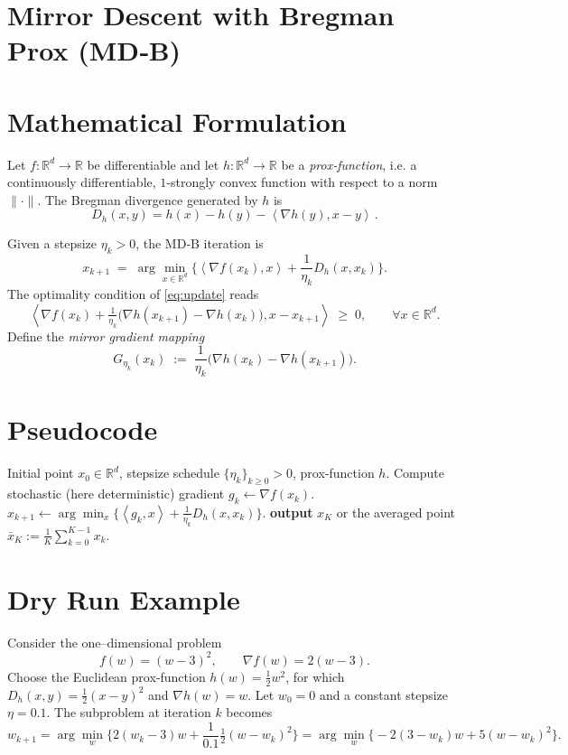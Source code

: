 \documentclass{article}
\newcommand{\inner}[2]{\left\langle #1,#2\right\rangle}
\newcommand{\Breg}[2]{D_{h}(#1,#2)}
\begin{document}
\section*{Mirror Descent with Bregman Prox (MD‑B)}

\section*{Mathematical Formulation}
Let $f:\mathbb{R}^{d}\rightarrow\mathbb{R}$ be differentiable and let $h:\mathbb{R}^{d}\rightarrow\mathbb{R}$ be a \emph{prox‑function}, i.e. a continuously differentiable, $1$‑strongly convex function with respect to a norm $\|\cdot\|$.
The Bregman divergence generated by $h$ is
\[
\Breg{x}{y}=h(x)-h(y)-\inner{\nabla h(y)}{x-y}\, .
\]

Given a stepsize $\eta_{k}>0$, the MD‑B iteration is
\begin{equation}\label{eq:update}
x_{k+1}
\;=\;
\arg\min_{x\in\mathbb{R}^{d}}
\Big\{ \inner{\nabla f(x_{k})}{x}
      +\frac{1}{\eta_{k}}\Breg{x}{x_{k}}\Big\}.
\end{equation}
The optimality condition of \eqref{eq:update} reads
\begin{equation}\label{eq:optcond}
\inner{\nabla f(x_{k})+\tfrac{1}{\eta_{k}}\bigl(\nabla h(x_{k+1})-\nabla h(x_{k})\bigr)}{x-x_{k+1}}\;\ge\;0,
\qquad\forall x\in\mathbb{R}^{d}.
\end{equation}
Define the \emph{mirror gradient mapping}
\[
G_{\eta_{k}}(x_{k}) \;:=\; \frac{1}{\eta_{k}}\bigl(\nabla h(x_{k})-\nabla h(x_{k+1})\bigr).
\]

\section*{Pseudocode}
\begin{algorithm}[H]
\caption{MD‑B (Mirror Descent with Bregman Prox)}
\begin{algorithmic}[1]
\Require Initial point $x_{0}\in\mathbb{R}^{d}$, stepsize schedule $\{\eta_{k}\}_{k\ge0}>0$, prox‑function $h$.
    \State Compute stochastic (here deterministic) gradient $g_{k}\gets\nabla f(x_{k})$.
    \State $x_{k+1}\gets\displaystyle\arg\min_{x}\Big\{ \inner{g_{k}}{x}+\frac{1}{\eta_{k}}D_{h}(x,x_{k})\Big\}$.
\EndFor
\State \textbf{output} $x_{K}$ or the averaged point $\bar x_{K}:=\frac{1}{K}\sum_{k=0}^{K-1}x_{k}$.
\end{algorithmic}
\end{algorithm}

\section*{Dry Run Example}
Consider the one–dimensional problem
\[
f(w)=(w-3)^{2},\qquad 
\nabla f(w)=2(w-3).
\]
Choose the Euclidean prox‑function $h(w)=\tfrac12 w^{2}$, for which
$D_{h}(x,y)=\tfrac12 (x-y)^{2}$ and $\nabla h(w)=w$.
Let $w_{0}=0$ and a constant stepsize $\eta=0.1$.
The subproblem at iteration $k$ becomes
\[
w_{k+1}
=\arg\min_{w}\Big\{2(w_{k}-3)w+\frac{1}{0.1}\tfrac12 (w-w_{k})^{2}\Big\}
=\arg\min_{w}\Big\{-2(3-w_{k})w+5(w-w_{k})^{2}\Big\}.
\]
\end{document}

